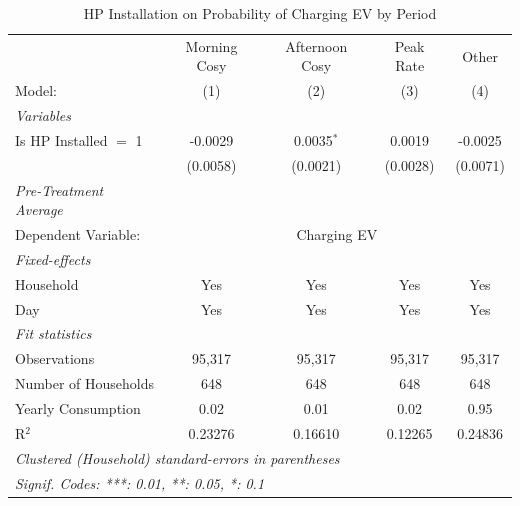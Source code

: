 
\begin{table}[htbp]
   \caption{\label{tab:hp-ev-charging} HP Installation on Probability of Charging EV by Period}
   \centering
   \begin{tabular}{lcccc}
      \tabularnewline \midrule \midrule
                                     & Morning Cosy & Afternoon Cosy & Peak Rate & Other \\   
      Model:                         & (1)          & (2)            & (3)       & (4)\\  
      \midrule
      \emph{Variables}\\
      Is HP Installed $=$ 1          & -0.0029      & 0.0035$^{*}$   & 0.0019    & -0.0025\\   
                                     & (0.0058)     & (0.0021)       & (0.0028)  & (0.0071)\\   
      \midrule
\emph{Pre-Treatment Average}\\
      Dependent Variable: & \multicolumn{4}{c}{Charging EV}\\
\midrule
      \emph{Fixed-effects}\\
      Household                      & Yes          & Yes            & Yes       & Yes\\  
      Day                            & Yes          & Yes            & Yes       & Yes\\  
      \midrule
      \emph{Fit statistics}\\
      Observations                   & 95,317       & 95,317         & 95,317    & 95,317\\  
      Number of Households & 648          & 648            & 648       & 648\\  
      Yearly Consumption             & 0.02         & 0.01           & 0.02      & 0.95\\  
      R$^2$                          & 0.23276      & 0.16610        & 0.12265   & 0.24836\\  
      \midrule \midrule
      \multicolumn{5}{l}{\emph{Clustered (Household) standard-errors in parentheses}}\\
      \multicolumn{5}{l}{\emph{Signif. Codes: ***: 0.01, **: 0.05, *: 0.1}}\\
   \end{tabular}
\end{table}


